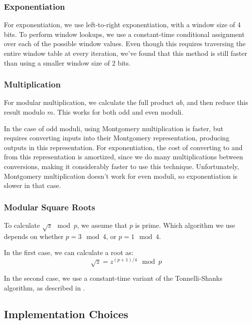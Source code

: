 \documentclass[11pt, a4paper]{article} %
\begin{document}
{\subsubsection{Exponentiation}

For exponentiation, we use left-to-right exponentiation,
with a window size of 4 bits. To perform window lookups,
we use a constant-time conditional assignment
over each of the possible window values. Even though this requires traversing
the entire window table at every iteration, we've found that this method
is still faster than using a smaller window size of 2 bits.

\subsubsection{Multiplication}

For modular multiplication, we calculate the full product
$ab$, and then reduce this result modulo $m$. This works
for both odd and even moduli.

In the case of odd moduli, using Montgomery multiplication
\cite{kaya_koc_analyzing_1996-1, pornin_bearssl_2020-1} is
faster, but requires converting inputs into their Montgomery
representation, producing outputs in this representation.
For exponentiation,
the cost of converting to and from this representation is amortized,
since we do many multiplications between conversions, making
it considerably faster to use this technique. Unfortunately,
Montgomery multiplication doesn't work for even moduli,
so exponentiation is slower in that case.

\subsubsection{Modular Square Roots}

To calculate $\sqrt{z} \mod p$, we assume that $p$ is prime.
Which algorithm we use depends on whether $p = 3 \mod 4$,
or $p = 1 \mod 4$.

In the first case, we can calculate a root as:
$$
\sqrt{z} = z^{(p + 1) / 4} \mod p
$$

In the second case, we use a constant-time variant
of the Tonnelli-Shanks algorithm, as described in 
\cite{wahby_hashing_nodate}.

\subsection{Implementation Choices}

}
\end{document}
